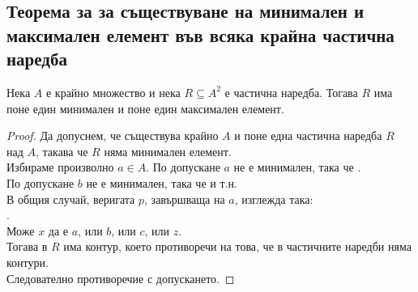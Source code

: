 \subsection{Теорема за за съществуване на минимален и максимален елемент във всяка крайна частична наредба}
\begin{theorem}
    Нека \(A\) е крайно множество и нека \(R \subseteq A^2\) е частична наредба. Тогава \(R\) има поне един 
    минимален и поне един максимален елемент.
\end{theorem}
\begin{proof}
    Да допуснем, че съществува крайно \(A\) и поне една частична наредба \(R\) над \(A\), такава че \(R\) няма
    минимален елемент. \\
    Избираме произволно \(a \in A\). По допускане \(a\) не е минимален, така че 
    . \\
    По допускане \(b\) не е минимален, така че  и т.н. \\
    В общия случай, веригата \(p\), завършваща на \(a\), изглежда така: \\
    . \\
    Може \(x\) да е \(a\), или \(b\), или \(c\), или \(z\). \\
    Тогава в \(R\) има контур, което противоречи на това, че в частичните наредби няма контури. \\
    Следователно противоречие с допускането.
\end{proof}

